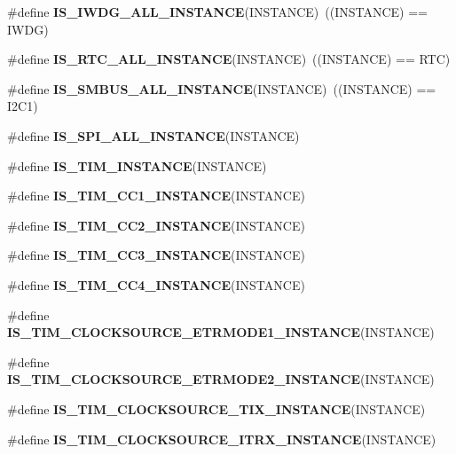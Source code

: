 \begin{DoxyCompactItemize}
\item 
\mbox{\label{group___exported__macro_gad9ec4c52f0572ee67d043e006f1d5e39}} 
\#define {\bfseries I\+S\+\_\+\+I\+W\+D\+G\+\_\+\+A\+L\+L\+\_\+\+I\+N\+S\+T\+A\+N\+CE}(I\+N\+S\+T\+A\+N\+CE)~((I\+N\+S\+T\+A\+N\+CE) == I\+W\+DG)
\item 
\mbox{\label{group___exported__macro_gab4230e8bd4d88adc4250f041d67375ce}} 
\#define {\bfseries I\+S\+\_\+\+R\+T\+C\+\_\+\+A\+L\+L\+\_\+\+I\+N\+S\+T\+A\+N\+CE}(I\+N\+S\+T\+A\+N\+CE)~((I\+N\+S\+T\+A\+N\+CE) == R\+TC)
\item 
\mbox{\label{group___exported__macro_gaf492fcfe71eab8d1dadf4d837b840af6}} 
\#define {\bfseries I\+S\+\_\+\+S\+M\+B\+U\+S\+\_\+\+A\+L\+L\+\_\+\+I\+N\+S\+T\+A\+N\+CE}(I\+N\+S\+T\+A\+N\+CE)~((I\+N\+S\+T\+A\+N\+CE) == I2\+C1)
\item 
\#define {\bfseries I\+S\+\_\+\+S\+P\+I\+\_\+\+A\+L\+L\+\_\+\+I\+N\+S\+T\+A\+N\+CE}(I\+N\+S\+T\+A\+N\+CE)
\item 
\#define {\bfseries I\+S\+\_\+\+T\+I\+M\+\_\+\+I\+N\+S\+T\+A\+N\+CE}(I\+N\+S\+T\+A\+N\+CE)
\item 
\#define {\bfseries I\+S\+\_\+\+T\+I\+M\+\_\+\+C\+C1\+\_\+\+I\+N\+S\+T\+A\+N\+CE}(I\+N\+S\+T\+A\+N\+CE)
\item 
\#define {\bfseries I\+S\+\_\+\+T\+I\+M\+\_\+\+C\+C2\+\_\+\+I\+N\+S\+T\+A\+N\+CE}(I\+N\+S\+T\+A\+N\+CE)
\item 
\#define {\bfseries I\+S\+\_\+\+T\+I\+M\+\_\+\+C\+C3\+\_\+\+I\+N\+S\+T\+A\+N\+CE}(I\+N\+S\+T\+A\+N\+CE)
\item 
\#define {\bfseries I\+S\+\_\+\+T\+I\+M\+\_\+\+C\+C4\+\_\+\+I\+N\+S\+T\+A\+N\+CE}(I\+N\+S\+T\+A\+N\+CE)
\item 
\#define {\bfseries I\+S\+\_\+\+T\+I\+M\+\_\+\+C\+L\+O\+C\+K\+S\+O\+U\+R\+C\+E\+\_\+\+E\+T\+R\+M\+O\+D\+E1\+\_\+\+I\+N\+S\+T\+A\+N\+CE}(I\+N\+S\+T\+A\+N\+CE)
\item 
\#define {\bfseries I\+S\+\_\+\+T\+I\+M\+\_\+\+C\+L\+O\+C\+K\+S\+O\+U\+R\+C\+E\+\_\+\+E\+T\+R\+M\+O\+D\+E2\+\_\+\+I\+N\+S\+T\+A\+N\+CE}(I\+N\+S\+T\+A\+N\+CE)
\item 
\#define {\bfseries I\+S\+\_\+\+T\+I\+M\+\_\+\+C\+L\+O\+C\+K\+S\+O\+U\+R\+C\+E\+\_\+\+T\+I\+X\+\_\+\+I\+N\+S\+T\+A\+N\+CE}(I\+N\+S\+T\+A\+N\+CE)
\item 
\#define {\bfseries I\+S\+\_\+\+T\+I\+M\+\_\+\+C\+L\+O\+C\+K\+S\+O\+U\+R\+C\+E\+\_\+\+I\+T\+R\+X\+\_\+\+I\+N\+S\+T\+A\+N\+CE}(I\+N\+S\+T\+A\+N\+CE)

\end{DoxyCompactItemize}
